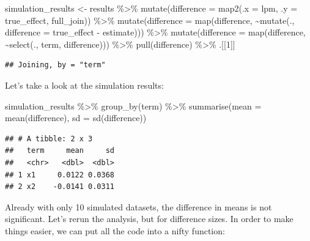 \documentclass[
]{article}
\newenvironment{Shaded}{\begin{snugshade}}{\end{snugshade}}
\newcommand{\AttributeTok}[1]{\textcolor[rgb]{0.77,0.63,0.00}{#1}}
\newcommand{\DecValTok}[1]{\textcolor[rgb]{0.00,0.00,0.81}{#1}}
\newcommand{\FunctionTok}[1]{\textcolor[rgb]{0.00,0.00,0.00}{#1}}
\newcommand{\NormalTok}[1]{#1}
\newcommand{\OtherTok}[1]{\textcolor[rgb]{0.56,0.35,0.01}{#1}}
\newcommand{\SpecialCharTok}[1]{\textcolor[rgb]{0.00,0.00,0.00}{#1}}
\begin{document}
\begin{Shaded}
\begin{Highlighting}[]
\NormalTok{simulation\_results }\OtherTok{\textless{}{-}}\NormalTok{ results }\SpecialCharTok{\%\textgreater{}\%} 
  \FunctionTok{mutate}\NormalTok{(}\AttributeTok{difference =} \FunctionTok{map2}\NormalTok{(}\AttributeTok{.x =}\NormalTok{ lpm, }\AttributeTok{.y =}\NormalTok{ true\_effect, full\_join)) }\SpecialCharTok{\%\textgreater{}\%}  
  \FunctionTok{mutate}\NormalTok{(}\AttributeTok{difference =} \FunctionTok{map}\NormalTok{(difference, }\SpecialCharTok{\textasciitilde{}}\FunctionTok{mutate}\NormalTok{(., }\AttributeTok{difference =}\NormalTok{ true\_effect }\SpecialCharTok{{-}}\NormalTok{ estimate))) }\SpecialCharTok{\%\textgreater{}\%} 
  \FunctionTok{mutate}\NormalTok{(}\AttributeTok{difference =} \FunctionTok{map}\NormalTok{(difference, }\SpecialCharTok{\textasciitilde{}}\FunctionTok{select}\NormalTok{(., term, difference))) }\SpecialCharTok{\%\textgreater{}\%} 
  \FunctionTok{pull}\NormalTok{(difference) }\SpecialCharTok{\%\textgreater{}\%} 
\NormalTok{  .[[}\DecValTok{1}\NormalTok{]]}
\end{Highlighting}
\end{Shaded}

\begin{verbatim}
## Joining, by = "term"
\end{verbatim}

Let's take a look at the simulation results:

\begin{Shaded}
\begin{Highlighting}[]
\NormalTok{simulation\_results }\SpecialCharTok{\%\textgreater{}\%} 
  \FunctionTok{group\_by}\NormalTok{(term) }\SpecialCharTok{\%\textgreater{}\%} 
  \FunctionTok{summarise}\NormalTok{(}\AttributeTok{mean =} \FunctionTok{mean}\NormalTok{(difference), }
            \AttributeTok{sd =} \FunctionTok{sd}\NormalTok{(difference))}
\end{Highlighting}
\end{Shaded}

\begin{verbatim}
## # A tibble: 2 x 3
##   term     mean     sd
##   <chr>   <dbl>  <dbl>
## 1 x1     0.0122 0.0368
## 2 x2    -0.0141 0.0311
\end{verbatim}

Already with only 10 simulated datasets, the difference in means is not significant. Let's rerun
the analysis, but for difference sizes. In order to make things easier, we can put all the code
into a nifty function:
\end{document}
